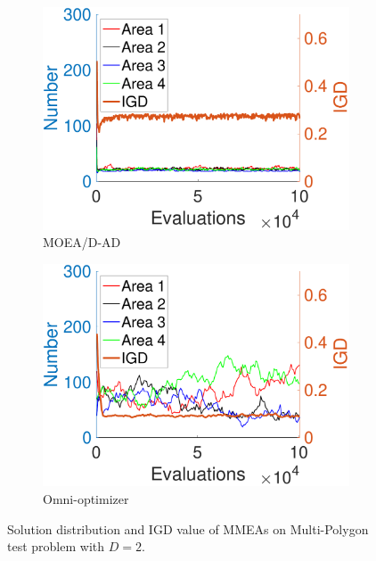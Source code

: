 \documentclass[conference]{IEEEtran}
\begin{document}
\begin{figure}[htbp]
    \begin{subfigure}[b]{.24\textwidth}
    \includegraphics[width=\linewidth]{Section5/dim2/Diversity/MOEADAD}
    \caption{MOEA/D-AD}
    \end{subfigure}
    \begin{subfigure}[b]{.24\textwidth}
    \includegraphics[width=\linewidth]{Section5/dim2/Diversity/OmniOptimizer}
    \caption{Omni-optimizer}
    \end{subfigure}
    \caption{Solution distribution and IGD value of MMEAs on Multi-Polygon test problem with $D=2$.}
    \label{fig: MMEAs Diversity dim=2}
\end{figure}
\end{document}
